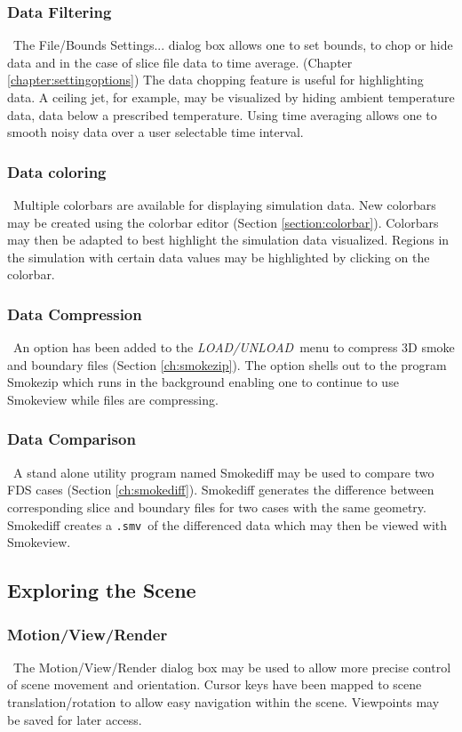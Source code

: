 \documentclass[11pt,twoside]{book}
\begin{document}
\subsubsection{Data Filtering}\ The File/Bounds Settings...
dialog box allows one to set bounds, to chop or hide data and in the case
of slice file data to time average. (Chapter \ref{chapter:settingoptions})
The data chopping
feature is useful for highlighting data.  A ceiling jet, for example,
may be visualized by hiding ambient temperature
data,  data below a prescribed temperature.
Using time averaging allows one to smooth noisy data over a user selectable time
interval.

\subsubsection{Data coloring}\ Multiple colorbars are available for displaying simulation data.
New colorbars may be created using the colorbar editor (Section \ref{section:colorbar}).
Colorbars may then be adapted to best highlight the simulation data visualized.
Regions in the simulation with certain data values may be highlighted by clicking
on the colorbar.

\subsubsection{Data Compression}\ An option has been added to the
{\em LOAD/UNLOAD}\ menu to compress 3D smoke and boundary
files (Section \ref{ch:smokezip}). The option shells out to the program Smokezip which runs in
the background enabling one to continue to use Smokeview while
files are compressing.

\subsubsection{Data Comparison}\ A stand alone utility program named Smokediff
may be used to compare two FDS cases (Section \ref{ch:smokediff}).
Smokediff generates the difference between corresponding slice and boundary
files for two cases with the same geometry.  Smokediff creates a
{\tt .smv}\ of the differenced data which may then be viewed with Smokeview.


\subsection{Exploring the Scene}

\subsubsection{Motion/View/Render}\ The Motion/View/Render dialog box may be used to
allow more precise control of scene movement and orientation.
Cursor keys have been mapped to scene translation/rotation to
allow easy navigation within the scene.  Viewpoints may be saved for later access.
\end{document}
